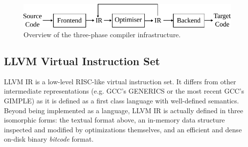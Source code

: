 \begin{figure}[h]
  \centering
  \includegraphics[scale=0.9]{figs/3-phase-compiler.pdf}
  \caption{Overview of the three-phase compiler infrastructure.}
  \label{fig:3-phase-compiler}
\end{figure}




\subsection{LLVM Virtual Instruction Set}

LLVM IR is a low-level RISC-like virtual instruction set.
It differs from other intermediate representations (e.g. GCC's GENERICS or the most recent GCC's GIMPLE) as it is defined as a first class language with well-defined semantics.
Beyond being implemented as a language, LLVM IR is actually defined in three isomorphic forms: the textual format above, an in-memory data structure inspected and modified by optimizations themselves, and an efficient and dense on-disk binary \textit{bitcode} format.


